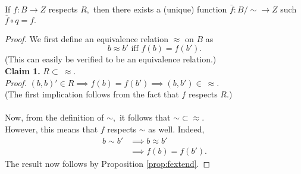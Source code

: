 \begin{prop}
	If $f:B\to Z$ respects $R,$ then there exists a (unique) function $\bar{f}:B/{\sim} \to Z$ such $\bar{f}\circ q = f.$
\end{prop}
\begin{proof} 
	We first define an equivalence relation $\approx$ on $B$ as 
	\begin{equation*} 
		b \approx b' \text{ iff } f(b) = f(b').
	\end{equation*}
	(This can easily be verified to be an equivalence relation.)\\
	\textbf{Claim 1.} $R \subset \ \approx.$\\
	\emph{Proof.} $(b, b)' \in R \implies f(b) = f(b') \implies (b, b') \in \ \approx.$ \\
	(The first implication follows from the fact that $f$ respects $R.$)\\~\\
	Now, from the definition of $\sim,$ it follows that ${\sim} \subset {\approx}.$\\
	However, this means that $f$ respects $\sim$ as well. Indeed,
	\begin{align*} 
		b \sim b' &\implies b \approx b'\\
		&\implies f(b) = f(b').
	\end{align*}
	The result now follows by Proposition \ref{prop:fextend}.
\end{proof}